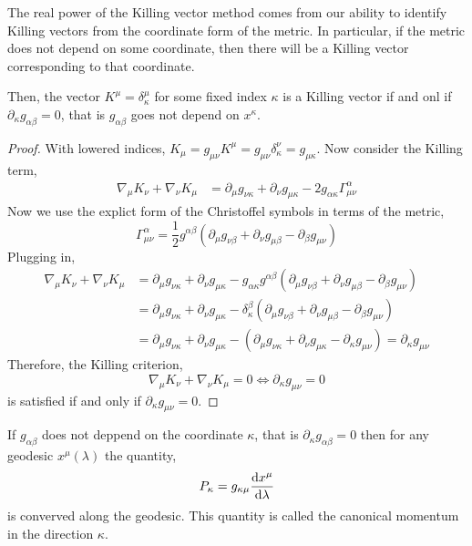 \documentclass[11pt, a4paper]{article}
\begin{document}
The real power of the Killing vector method comes from our ability to identify Killing vectors from the coordinate form of the metric. In particular, if the metric does not depend on some coordinate, then there will be a Killing vector corresponding to that coordinate.

\begin{theorem}
Then, the vector $K^{\mu} = \delta_{\kappa}^{\mu}$ for some fixed index $\kappa$ is a Killing vector if and onl if $\partial_{\kappa} g_{\alpha \beta} = 0$, that is $g_{\alpha \beta}$ goes not depend on $x^{\kappa}$.
\end{theorem}

\begin{proof}
With lowered indices, $K_{\mu} = g_{\mu \nu} K^\mu = g_{\mu \nu} \delta_{\kappa}^{\nu} = g_{\mu \kappa}$. Now consider the Killing term,
\begin{align*}
\nabla_{\mu} K_{\nu} + \nabla_{\nu} K_{\mu} & = \partial_{\mu} g_{\nu \kappa} + \partial_{\nu} g_{\mu \kappa} - 2 g_{\alpha \kappa} \Gamma^{\alpha}_{\mu \nu}
\end{align*}
Now we use the explict form of the Christoffel symbols in terms of the metric,
\[ \Gamma^\alpha_{\mu \nu} = \frac{1}{2} g^{\alpha \beta} \left( \partial_{\mu} g_{\nu \beta} + \partial_{\nu} g_{\mu \beta} - \partial_{\beta} g_{\mu \nu} \right) \]
Plugging in,
\begin{align*}
\nabla_{\mu} K_{\nu} + \nabla_{\nu} K_{\mu} & = \partial_{\mu} g_{\nu \kappa} + \partial_{\nu} g_{\mu \kappa} - g_{\alpha \kappa} g^{\alpha \beta} \left( \partial_{\mu} g_{\nu \beta} + \partial_{\nu} g_{\mu \beta} - \partial_{\beta} g_{\mu \nu} \right)
\\
& = \partial_{\mu} g_{\nu \kappa} + \partial_{\nu} g_{\mu \kappa} - \delta^{\beta}_{\kappa} \left( \partial_{\mu} g_{\nu \beta} + \partial_{\nu} g_{\mu \beta} - \partial_{\beta} g_{\mu \nu} \right)
\\
& = \partial_{\mu} g_{\nu \kappa} + \partial_{\nu} g_{\mu \kappa} - \left( \partial_{\mu} g_{\nu \kappa} + \partial_{\nu} g_{\mu \kappa} - \partial_{\kappa} g_{\mu \nu} \right) = \partial_{\kappa} g_{\mu \nu}
\end{align*}
Therefore, the Killing criterion,
\[ \nabla_{\mu} K_{\nu} + \nabla_{\nu} K_{\mu} = 0 \iff \partial_{\kappa} g_{\mu \nu} = 0\]
is satisfied if and only if $\partial_{\kappa} g_{\mu \nu} = 0$.
\end{proof}

\begin{corollary}
If $g_{\alpha \beta}$ does not deppend on the coordinate $\kappa$, that is $\partial_\kappa g_{\alpha \beta} = 0$ then for any geodesic $x^{\mu}(\lambda)$ the quantity,
\[P_\kappa = g_{\kappa \mu} \frac{\mathrm{d}x^{\mu}}{\mathrm{d}\lambda} \]
is converved along the geodesic. This quantity is called the canonical momentum in the direction $\kappa$.  
\end{corollary} 
\end{document}
